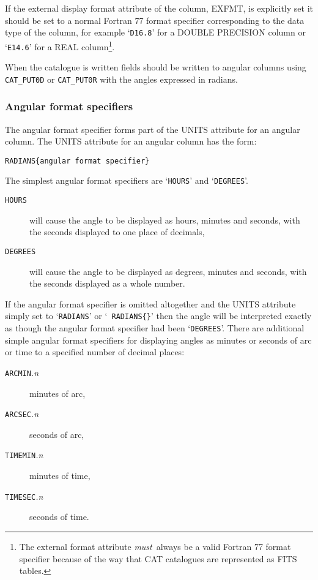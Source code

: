 If the external display format attribute of the column, EXFMT, 
is explicitly set it should be set to a normal Fortran 77 format 
specifier corresponding to the data type of the column, for 
example `{\tt D16.8}' for a DOUBLE PRECISION column or `{\tt E14.6}'
for a REAL column\footnote{The external format attribute {\it 
must}\, always be a valid Fortran 77 format specifier because of 
the way that CAT catalogues are represented as FITS tables.}.

When the catalogue is written fields should be written to 
angular columns using {\tt CAT\_PUT0D} or {\tt CAT\_PUT0R} with 
the angles expressed in radians.

\subsubsection{Angular format specifiers}

The angular format specifier forms part of the UNITS attribute for an
angular column. The UNITS attribute for an angular column has the
form:

\begin{center}
{\tt RADIANS\{angular format specifier\} }
\end{center}

The simplest angular format specifiers are `{\tt HOURS}' and 
`{\tt DEGREES}'.

\begin{description}

  \item[{\tt HOURS}] will cause the angle to be displayed as 
   hours, minutes and seconds, with the seconds displayed to one 
   place of decimals,

  \item[{\tt DEGREES}] will cause the angle to be displayed as 
   degrees, minutes and seconds, with the seconds displayed as a 
   whole number.

\end{description}

If the angular format specifier is omitted altogether and 
the UNITS attribute simply set to `{\tt RADIANS}' or `{\tt 
RADIANS\{\}}' then the angle will be interpreted exactly as 
though the angular format specifier had been `{\tt DEGREES}'.
There are additional simple angular format specifiers for displaying
angles as minutes or seconds of arc or time to a specified number of
decimal places:

\begin{description}

  \item[{\tt ARCMIN}{\it .n}] minutes of arc,

  \item[{\tt ARCSEC}{\it .n}] seconds of arc,

  \item[{\tt TIMEMIN}{\it .n}] minutes of time,

  \item[{\tt TIMESEC}{\it .n}] seconds of time.


\end{description}

